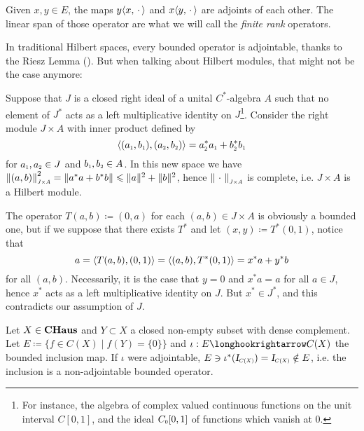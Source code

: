 \begin{exemplo}
    \label{exemplo:finite rank}
    Given $x,y \in E$, the maps $y\langle {x},{\operatorname{\,\cdot\,}}\rangle$ and $x\langle {y},{\operatorname{\,\cdot\,}}\rangle$ are adjoints of each other. The linear span of those operator are what we will call the \textit{finite rank} operators.
\end{exemplo}
    
In traditional Hilbert spaces, every bounded operator is adjointable, thanks to the Riesz Lemma (\cite{reed2012methods}). But when talking about Hilbert modules, that might not be the case anymore:
    
\begin{contraexemplo}\label{contraexemplo: paschke non adjointable}
    Suppose that $J$ is a closed right ideal of a unital $C^{*}$-algebra $A$ such that no element of $J^{*}$ acts as a left multiplicative identity on $J$\footnote{For instance, the algebra of complex valued continuous functions on the unit interval $C[0,1]$, and the ideal $\sub C0[0,1]$ of functions which vanish at 0.}. Consider the right module $J \times A$ with inner product defined by 
    \begin{equation*}
    \inner{\left(\sub a{1}, \sub b{1}\right)}{\left(\sub a{2}, \sub b{2}\right)} = \sub a{2}^{*} \sub a{1}+\sub b{2}^{*} \sub b{1}
    \end{equation*}
    for $\sub a1, \sub a2 \in J$ and $\sub b1, \sub b2 \in A$. In this new space we have $\sub{\|(a, b)\|}{J\times A}^2=\left\|a^{*} a+b^* b\right\|\leq \|a\|^{2}+\|b\|^{2}$, hence $\sub{\|\come\|}{J\times A}$ is complete, i.e. $J\times A$ is a Hilbert module. 
    
    The operator $T(a,b)\coloneqq (0,a)$ for each $(a,b) \in J\times A$ is obviously a bounded one, but if we suppose that there exists $T^*$ and let $(x,y) \coloneqq T^*(0,1)$, notice that
    \begin{equation*}
        a = \langle {T(a,b)},{(0,1)}\rangle = \langle {(a,b)},{T^*(0,1)}\rangle = x^*a+y^*b
    \end{equation*}
    for all $(a,b)$. Necessarily, it is the case that $y=0$ and $x^*a=a$ for all $a\in J$, hence $x^*$ acts as a left multiplicative identity on $J$. But $x^* \in J^*$, and this contradicts our assumption of $J$.
\end{contraexemplo}
    
\begin{contraexemplo}
    Let $X\in \boldsymbol{\operatorname{CHaus}}$ and $Y \subset X$ a closed non-empty subset with dense complement. Let $E \coloneqq \big\{f \in C(X) \mid f(Y) = \{0\}\big\}$ and $\iota : E \longhookrightarrow C(X)$ the bounded inclusion map. If $\iota$ were adjointable, $E \ni \iota^*(\sub\Id{C(X)}) = \sub\Id{C(X)} \notin E$, i.e. the inclusion is a non-adjointable bounded operator.
\end{contraexemplo}
        
